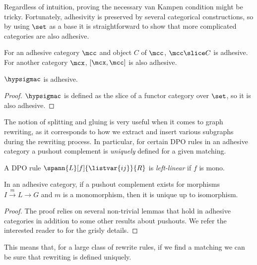 Regardless of intuition, proving the necessary van Kampen condition might be
tricky.
Fortunately, adhesivity is preserved by several categorical constructions, so
by using \(\set\) as a base it is straightforward to show that more complicated
categories are also adhesive.

\begin{proposition}
    For an adhesive category \(\mcc\) and object \(C\) of \(\mcc\),
    \(\mcc \slice C\) is adhesive.
    For another category \(\mcx\), \([\mcx, \mcc]\) is also adhesive.
\end{proposition}

\begin{corollary}
    \(\hypsigmac\) is adhesive.
\end{corollary}
\begin{proof}
    \(\hypsigmac\) is defined as the slice of a functor category over \(\set\),
    so it is also adhesive.
\end{proof}

The notion of splitting and gluing is very useful when it comes to graph
rewriting, as it corresponds to how we extract and insert various subgraphs
during the rewriting process.
In particular, for certain DPO rules in an adhesive category a pushout
complement is \emph{uniquely} defined for a given matching.

\begin{definition}
    A DPO rule \(\spann{L}[f]{\listvar{ij}}{R}\) is \emph{left-linear} if \(f\)
    is mono.
\end{definition}

\begin{theorem}
    In an adhesive category, if a pushout complement exists for morphisms
    \(I \xrightarrow{m} L \to G\) and \(m\) is a monomorphism, then it is unique
    up to isomorphism.
\end{theorem}
\begin{proof}
    The proof relies on several non-trivial lemmas that hold in adhesive
    categories in addition to some other results about pushouts.
    We refer the interested reader to
    \cite[Lems. 4.3.6 - 4.3.9]{kissinger2012pictures} for the grisly details.
\end{proof}

This means that, for a large class of rewrite rules, if we find a matching we
can be sure that rewriting is defined uniquely.

\begin{example}
\end{example}

